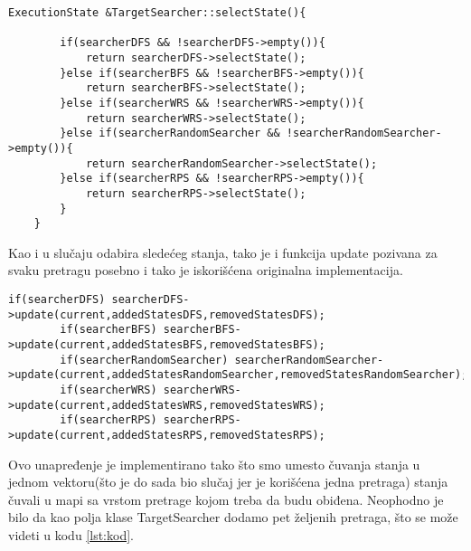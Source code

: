 \documentclass[a4paper]{article}
\begin{document}
\newpage
\begin{lstlisting}[title={Odabir sledećeg stanja}]
    ExecutionState &TargetSearcher::selectState(){

        if(searcherDFS && !searcherDFS->empty()){
            return searcherDFS->selectState();
        }else if(searcherBFS && !searcherBFS->empty()){
            return searcherBFS->selectState();
        }else if(searcherWRS && !searcherWRS->empty()){
            return searcherWRS->selectState();
        }else if(searcherRandomSearcher && !searcherRandomSearcher->empty()){
            return searcherRandomSearcher->selectState();
        }else if(searcherRPS && !searcherRPS->empty()){
            return searcherRPS->selectState();
        }
    }
\end{lstlisting}
Kao i u slučaju odabira sledećeg stanja, tako je i funkcija update pozivana za svaku pretragu posebno i tako je iskorišćena originalna implementacija.
\begin{lstlisting}[title={Update funkcija}]
        if(searcherDFS) searcherDFS->update(current,addedStatesDFS,removedStatesDFS);
        if(searcherBFS) searcherBFS->update(current,addedStatesBFS,removedStatesBFS);
        if(searcherRandomSearcher) searcherRandomSearcher->update(current,addedStatesRandomSearcher,removedStatesRandomSearcher);
        if(searcherWRS) searcherWRS->update(current,addedStatesWRS,removedStatesWRS);
        if(searcherRPS) searcherRPS->update(current,addedStatesRPS,removedStatesRPS);
\end{lstlisting}

Ovo unapređenje je implementirano tako što smo umesto čuvanja stanja u jednom vektoru(što je do sada bio slučaj jer je korišćena jedna pretraga) stanja čuvali u mapi sa vrstom pretrage kojom treba da budu obiđena. Neophodno je bilo da kao polja klase TargetSearcher dodamo pet željenih pretraga, što se može videti u kodu \ref{lst:kod}. 
\end{document}
